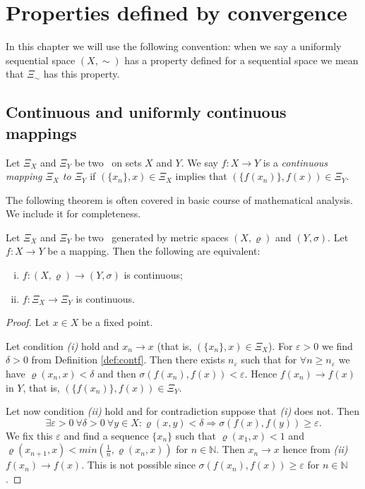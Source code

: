 \chapter{Properties defined by convergence} 

In this chapter we will use the following convention: when we say a uniformly sequential space $(X,\sim)$ has a property defined for a sequential space we mean that $\Xi_\sim$ has this property.

\section{Continuous and uniformly continuous mappings}

\begin{define}\label{def:cont}
Let $\Xi_X$ and $\Xi_Y$ be two \fcss\ on sets $X$ and $Y$. We say $f:X\to Y$ is a \emph{continuous mapping $\Xi_X$ to $\Xi_Y$} if $(\{x_n\},x)\in\Xi_X$ implies that $\left(\{f(x_n)\},f(x)\right)\in\Xi_Y$.
\end{define}

The following theorem is often covered in basic course of mathematical analysis. We include it for completeness.

\begin{theorem} \label{th:contpr}
Let $\Xi_X$ and $\Xi_Y$ be two \fcss\ generated by metric spaces $(X,\varrho)$ and $(Y,\sigma)$. Let $f:X\to Y$ be a mapping. Then the following are equivalent:
\begin{enumerate}[(i)]
	\item $f:(X,\varrho)\to (Y, \sigma)$ is continuous;
	\item $f:\Xi_X\to \Xi_Y$ is continuous.
\end{enumerate}
\end{theorem} 
\begin{proof}
Let $x\in X$ be a fixed point.

Let condition \emph{(i)} hold and $x_n\to x$ (that is, $(\{x_n\},x)\in\Xi_X$). For $\varepsilon>0$ we find $\delta>0$ from Definition  \ref{def:contf}. Then there exists $n_\varepsilon$ such that for $\forall n\ge n_\varepsilon$ we have $\varrho(x_n, x)<\delta$ and then $\sigma(f(x_n), f(x))<\varepsilon$. Hence $f(x_n)\to f(x)$ in $Y$, that is, $(\{f(x_n)\},f(x))\in\Xi_Y$.

Let now condition \emph{(ii)} hold and for contradiction suppose that \emph{(i)} does not. Then
\[
	\exists \varepsilon>0\ \forall\delta>0\ \forall y\in X: \varrho(x,y)<\delta \Rightarrow \sigma(f(x), f(y))\ge\varepsilon.
\]
We fix this $\varepsilon$ and find a sequence $\{x_n\}$ such that $\varrho(x_1,x)<1$ and $\varrho(x_{n+1},x)<min(\frac{1}{n},\varrho(x_n,x))$ for $n\in \mathbb{N}$. Then $x_n\to x$ hence from \emph{(ii)} $f(x_n)\to f(x)$. This is not possible since 
$\sigma(f(x_n), f(x))\ge\varepsilon$ for $n\in \mathbb{N}$.
\end{proof}

